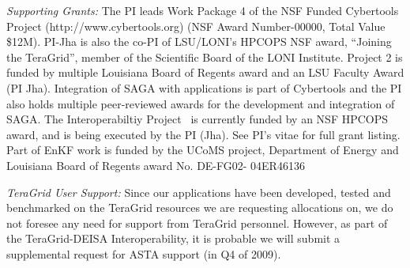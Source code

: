 \documentclass[a4paper,10pt]{article}
\begin{document}
{\it Supporting Grants:} The PI leads Work Package 4 of the NSF Funded Cybertools Project (http://www.cybertools.org) (NSF Award Number-00000, Total Value \$12M).  PI-Jha is also the co-PI of LSU/LONI's HPCOPS NSF award, ``Joining the TeraGrid'', member of the Scientific Board of the LONI Institute.  Project 2 is funded by multiple Louisiana Board of Regents award and an LSU Faculty Award (PI Jha). Integration of SAGA with applications is part of Cybertools and the PI also holds multiple peer-reviewed awards for the development and integration of SAGA.  The Interoperabiltiy Project~\cite{interop_url} is currently funded by an NSF HPCOPS award, and is being executed by the PI (Jha). See PI's vitae for full grant listing. Part of EnKF work is funded by the UCoMS project, Department of Energy and Louisiana Board of Regents award No. DE-FG02- 04ER46136

% 
{\it TeraGrid User Support:} Since our applications have been developed, tested and benchmarked on the TeraGrid resources we are requesting allocations on, we do not foresee any need for support from TeraGrid personnel. However, as part of the TeraGrid-DEISA Interoperability, it is probable we will submit a supplemental request for ASTA support (in Q4 of 2009).







\end{document}
